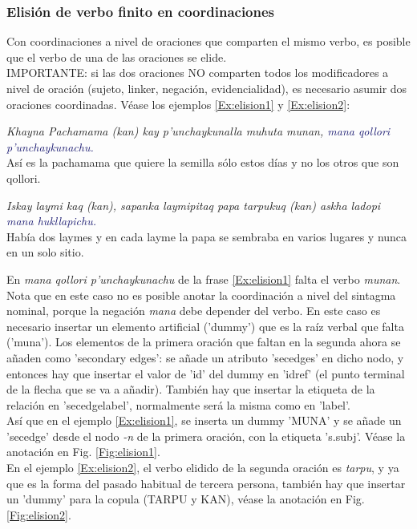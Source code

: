 \documentclass[a4paper,11pt,DIV12]{scrartcl}
\begin{document}
\subsubsection{Elisi\'on de verbo finito en coordinaciones}
Con coordinaciones a nivel de oraciones que comparten el mismo verbo, es posible que el verbo de una de las oraciones se elide.\\
IMPORTANTE: si las dos oraciones NO comparten todos los modificadores a nivel de oraci\'on (sujeto, linker, negaci\'on, evidencialidad), es necesario asumir dos oraciones coordinadas. V\'ease los ejemplos \ref{Ex:elision1} y \ref{Ex:elision2}:

\begin{examples}
 \item\label{Ex:elision1} {\em Khayna Pachamama (kan) kay p'unchaykunalla muhuta munan, \textcolor{MidnightBlue}{mana qollori p'unchaykunachu.}}\\
	Así es la pachamama que quiere la semilla sólo estos días y no los otros que son qollori.\\
	 	\hfill{\small \citep{Valderrama77}}
\item\label{Ex:elision2} {\em Iskay laymi kaq (kan), sapanka laymipitaq papa tarpukuq (kan) askha ladopi \textcolor{MidnightBlue}{mana hukllapichu.}}\\
      Había dos laymes y en cada layme la papa se sembraba en varios lugares y nunca en un solo sitio.\\
	 	\hfill{\small \citep{Valderrama77}}
\end{examples}

En {\em mana qollori p'unchaykunachu} de la frase \ref{Ex:elision1} falta el verbo {\em munan}. Nota que en este caso no es posible anotar la coordinaci\'on a nivel del sintagma nominal, porque la negaci\'on {\em mana} debe depender del verbo. En este caso es necesario insertar un elemento artificial ('dummy') que es la ra\'iz verbal que falta ('muna'). Los elementos de la primera oraci\'on que faltan en la segunda ahora se a\~naden como 'secondary edges': se a\~nade un atributo  'secedges' en dicho nodo, y entonces hay que insertar el valor de 'id' del dummy en 'idref' (el punto terminal de la flecha que se va a a\~nadir). Tambi\'en hay que insertar la etiqueta de la relaci\'on en 'secedgelabel', normalmente ser\'a la misma como en 'label'.\\
As\'i que en el ejemplo \ref{Ex:elision1}, se inserta un dummy 'MUNA' y se a\~nade un 'secedge' desde el nodo {\em -n} de la primera oraci\'on, con la etiqueta 's.subj'. V\'ease la anotaci\'on en Fig. \ref{Fig:elision1}.\\
En el ejemplo \ref{Ex:elision2}, el verbo elidido de la segunda oraci\'on es {\em tarpu}, y ya que es la forma del pasado habitual de tercera persona, tambi\'en hay que insertar un 'dummy' para la copula (TARPU y KAN), v\'ease la anotaci\'on en Fig. \ref{Fig:elision2}.
\end{document}
